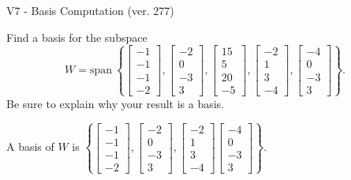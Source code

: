 \begin{exercise}
  \begin{exerciseTitle}V7 - Basis Computation (ver. 277)\end{exerciseTitle}
  \begin{exerciseStatement}
    Find a basis for the subspace 
\[W=\mathrm{span}\ \left\{\left[\begin{array}{r}
-1 \\
-1 \\
-1 \\
-2
\end{array}\right] , \left[\begin{array}{r}
-2 \\
0 \\
-3 \\
3
\end{array}\right] , \left[\begin{array}{r}
15 \\
5 \\
20 \\
-5
\end{array}\right] , \left[\begin{array}{r}
-2 \\
1 \\
3 \\
-4
\end{array}\right] , \left[\begin{array}{r}
-4 \\
0 \\
-3 \\
3
\end{array}\right]\right\}.\]
 Be sure to explain why your result is a basis.


  \end{exerciseStatement}
  \begin{exerciseAnswer}
   A basis of \(W\) is  \(\left\{\left[\begin{array}{r}
-1 \\
-1 \\
-1 \\
-2
\end{array}\right] , \left[\begin{array}{r}
-2 \\
0 \\
-3 \\
3
\end{array}\right] , \left[\begin{array}{r}
-2 \\
1 \\
3 \\
-4
\end{array}\right] \left[\begin{array}{r}
-4 \\
0 \\
-3 \\
3
\end{array}\right]\right\}\).
  


  \end{exerciseAnswer}
\end{exercise}